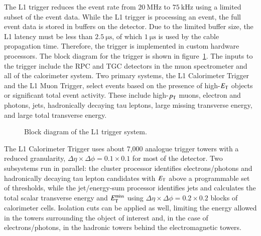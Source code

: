 The L1 trigger reduces the event rate from $\SI{20}{\mega\hertz}$ to $\SI{75}{\kilo\hertz}$ using a limited subset of the event data. While the L1 trigger is processing an event, the full event data is stored in buffers on the detector. Due to the limited buffer size, the L1 latency must be less than $\SI{2.5}{\micro\second}$, of which $\SI{1}{\micro\second}$ is used by the cable propagation time. Therefore, the trigger is implemented in custom hardware processors. The block diagram for the trigger is shown in figure~\ref{fig:ATLAS-trigger-L1-block}. The inputs to the trigger include the RPC and TGC detectors in the muon spectrometer and all of the calorimeter system.  Two primary systems, the L1 Calorimeter Trigger and the L1 Muon Trigger, select events based on the presence of high-$E_{\mathrm{T}}$ objects or significant total event activity. These include high-$p_{\text{T}}$ muons, electron and photons, jets, hadronically decaying tau leptons, large missing transverse energy, and large total transverse energy. 

\begin{figure}[htbp]
	\centering
	\caption{Block diagram of the L1 trigger system.}
	\label{fig:ATLAS-trigger-L1-block}
\end{figure}

The L1 Calorimeter Trigger uses about 7,000 analogue trigger towers with a reduced granularity, $\Delta\eta\times\Delta\phi=0.1\times0.1$ for most of the detector. Two subsystems run in parallel: the cluster processor identifies electrons/photons and hadronically decaying tau lepton candidates with $E_{\mathrm{T}}$ above a programmable set of thresholds, while the jet/energy-sum processor identifies jets and calculates the total scalar transverse energy and $E_{\text{T}}^{\text{miss}}$ using $\Delta\eta\times\Delta\phi=0.2\times0.2$ blocks of calorimeter cells. Isolation cuts can be applied as well, limiting the energy allowed in the towers surrounding the object of interest and, in the case of electrons/photons, in the hadronic towers behind the electromagnetic towers. 

